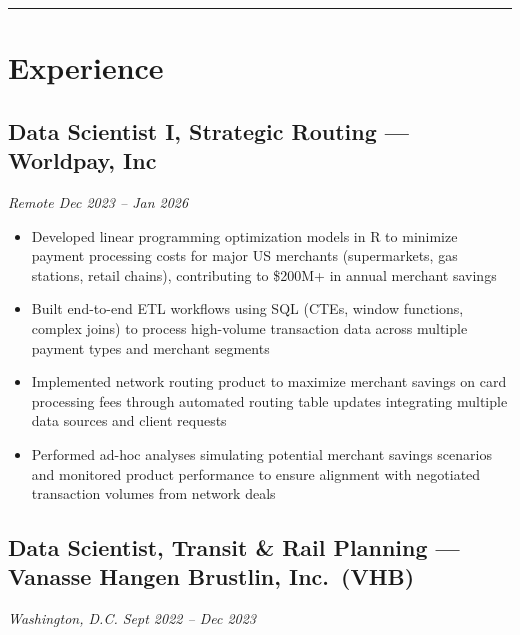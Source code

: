\documentclass[
  11pt,
]{article}
\begin{document}
\begin{center}\rule{0.5\linewidth}{0.5pt}\end{center}

\hypertarget{experience}{%
\section{Experience}\label{experience}}

\hypertarget{data-scientist-i-strategic-routing-worldpay-inc}{%
\subsection{Data Scientist I, Strategic Routing --- Worldpay,
Inc}\label{data-scientist-i-strategic-routing-worldpay-inc}}

\emph{Remote \textbar{} Dec 2023 -- Jan 2026}

\begin{itemize}
\item
  Developed linear programming optimization models in R to minimize
  payment processing costs for major US merchants (supermarkets, gas
  stations, retail chains), contributing to \$200M+ in annual merchant
  savings
\item
  Built end-to-end ETL workflows using SQL (CTEs, window functions,
  complex joins) to process high-volume transaction data across multiple
  payment types and merchant segments
\item
  Implemented network routing product to maximize merchant savings on
  card processing fees through automated routing table updates
  integrating multiple data sources and client requests
\item
  Performed ad-hoc analyses simulating potential merchant savings
  scenarios and monitored product performance to ensure alignment with
  negotiated transaction volumes from network deals
\end{itemize}

\hypertarget{data-scientist-transit-rail-planning-vanasse-hangen-brustlin-inc.-vhb}{%
\subsection{Data Scientist, Transit \& Rail Planning --- Vanasse Hangen
Brustlin,
Inc.~(VHB)}\label{data-scientist-transit-rail-planning-vanasse-hangen-brustlin-inc.-vhb}}

\emph{Washington, D.C. \textbar{} Sept 2022 -- Dec 2023}
\end{document}
